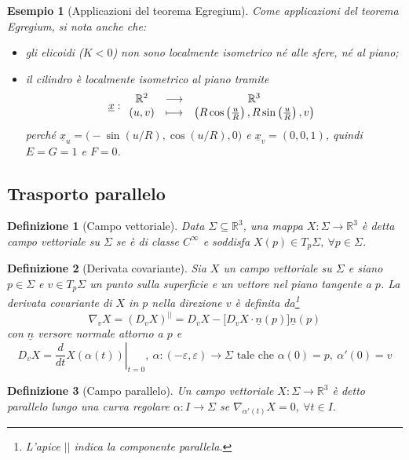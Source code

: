 \documentclass[12pt]{scrartcl}
\theoremstyle{style}
\newtheorem{esempio}{Esempio}[section]
\newtheorem{definizione}{Definizione}[section]
\newcommand*\Eval[3]{\left.#1\right\rvert_{#2}^{#3}}
\numberwithin{equation}{subsection}
\begin{document}
\begin{esempio}
	[Applicazioni del teorema Egregium]
Come applicazioni del teorema Egregium, si nota anche che:
\begin{itemize}
	\item gli elicoidi ($K<0$) non sono localmente isometrico n\'e alle sfere, n\'e al piano;
	\item il cilindro \`e localmente isometrico al piano tramite
		\[
		\underline{x}:
		\begin{array}
			{c c c}
			\mathbb{R}^2 & \longrightarrow & \mathbb{R}^3\\
			(u,v) & \longmapsto & \left(R \cos \left(\frac{u}{R}\right) , R \sin \left(\frac{u}{R}\right) , v\right) 
		\end{array}
		\] 
		perch\'e $\underline{x}_u= \big(- \sin (u / R), \cos ( u / R) , 0\big)$ e $\underline{x}_v = (0,0,1)$, quindi $E =G=1$ e $F=0$.
\end{itemize}
\end{esempio}


\subsection{Trasporto parallelo}

\begin{definizione}
	[Campo vettoriale]
	Data $\Sigma \subseteq \mathbb{R}^3$, una mappa $X:\Sigma \to \mathbb{R}^3$ \`e detta \textit{campo vettoriale} su $\Sigma$ se \`e di classe $C^\infty$ e soddisfa $X(p) \in T_p\Sigma, \ \forall p \in \Sigma$.
\end{definizione}
\begin{definizione}
	[Derivata covariante]
	Sia $X$ un campo vettoriale su $\Sigma$ e siano $p \in \Sigma$ e $v \in T_p\Sigma$ un punto sulla superficie e un vettore nel piano tangente a $p$.
	La \textit{derivata covariante} di $X$ in $p$ nella direzione $v$ \`e definita da\footnote{L'apice $| |$ indica la componente parallela.}
	\[
		\nabla _v X = (D_v X)^{| |}  = D_v X - \big[D_v X \cdot \underline{n}(p)\big]\underline{n}(p)
	\]
	con $\underline{n}$ versore normale attorno a $p$ e 
	\[
		D_v X = \Eval{\frac{d }{d t} X(\alpha (t))}{t=0}{}, \ \alpha :(-\varepsilon ,\varepsilon )\to \Sigma \text{ tale che } \alpha (0) =p , \ \alpha '(0) = v
	\] 
\end{definizione}
	\begin{definizione}
		[Campo parallelo]
		Un campo vettoriale $X : \Sigma \to \mathbb{R}^3$ \`e detto \textit{parallelo} lungo una curva regolare $\alpha : I \to \Sigma$ se $\nabla _{\alpha '(t)} X = 0, \ \forall t \in I$.
	\end{definizione}
\end{document}
